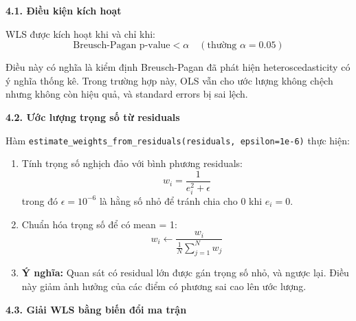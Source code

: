\textbf{4.1. Điều kiện kích hoạt}

WLS được kích hoạt khi và chỉ khi:
\begin{equation}
\text{Breusch-Pagan p-value} < \alpha \quad (\text{thường } \alpha = 0.05)
\end{equation}

Điều này có nghĩa là kiểm định Breusch-Pagan đã phát hiện heteroscedasticity có ý nghĩa thống kê. Trong trường hợp này, OLS vẫn cho ước lượng không chệch nhưng không còn hiệu quả, và standard errors bị sai lệch.

\textbf{4.2. Ước lượng trọng số từ residuals}

Hàm \texttt{estimate\_weights\_from\_residuals(residuals, epsilon=1e-6)} thực hiện:
\begin{enumerate}
    \item Tính trọng số nghịch đảo với bình phương residuals:
    \begin{equation}
    w_i = \frac{1}{e_i^2 + \epsilon}
    \end{equation}
    trong đó $\epsilon = 10^{-6}$ là hằng số nhỏ để tránh chia cho 0 khi $e_i = 0$.
    
    \item Chuẩn hóa trọng số để có mean = 1:
    \begin{equation}
    w_i \leftarrow \frac{w_i}{\frac{1}{N}\sum_{j=1}^{N} w_j}
    \end{equation}
    
    \item \textbf{Ý nghĩa:} Quan sát có residual lớn được gán trọng số nhỏ, và ngược lại. Điều này giảm ảnh hưởng của các điểm có phương sai cao lên ước lượng.
\end{enumerate}

\textbf{4.3. Giải WLS bằng biến đổi ma trận}

